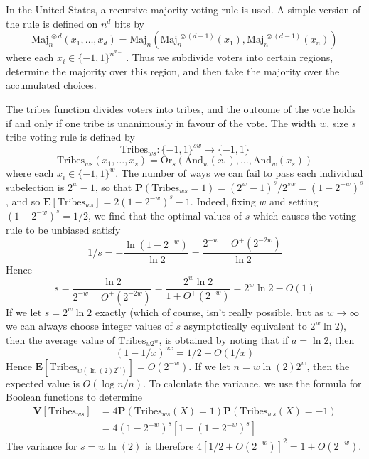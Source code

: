 \begin{example}
    In the United States, a recursive majority voting rule is used. A simple version of the rule is defined on $n^d$ bits by
    \[ \text{Maj}_n^{\ \otimes d}(x_1, \dots, x_d) = \text{Maj}_n(\text{Maj}^{\ \otimes (d-1)}_n(x_1), \text{Maj}^{\ \otimes (d-1)}_n(x_n)) \]
    where each $x_i \in \{ -1, 1 \}^{n^{d-1}}$. Thus we subdivide voters into certain regions, determine the majority over this region, and then take the majority over the accumulated choices.
\end{example}

\begin{example}
    The tribes function divides voters into tribes, and the outcome of the vote holds if and only if one tribe is unanimously in favour of the vote. The width $w$, size $s$ tribe voting rule is defined by
    \[ \text{Tribes}_{ws}: \{ -1, 1 \}^{sw} \to \{ -1, 1 \} \]
    \[ \text{Tribes}_{ws}(x_1, \dots, x_s) = \text{Or}_s(\text{And}_w(x_1), \dots, \text{And}_w(x_s)) \]
    where each $x_i \in \{ -1, 1 \}^w$. The number of ways we can fail to pass each individual subelection is $2^w - 1$, so that $\mathbf{P}(\text{Tribes}_{ws} = 1) = (2^w - 1)^s/2^{sw} = (1 - 2^{-w})^s$, and so $\mathbf{E}[\text{Tribes}_{ws}] = 2(1 - 2^{-w})^s - 1$. Indeed, fixing $w$ and setting $(1 - 2^{-w})^s = 1/2$, we find that the optimal values of $s$ which causes the voting rule to be unbiased satisfy
    \[ 1/s = - \frac{\ln(1 - 2^{-w})}{\ln 2} = \frac{2^{-w} + O^+(2^{-2w})}{\ln 2} \]
    Hence
    \[ s = \frac{\ln 2}{2^{-w} + O^+(2^{-2w})} = \frac{2^w \ln 2}{1 + O^+(2^{-w})} = 2^w \ln 2 - O(1) \]
    If we let $s = 2^w \ln 2$ exactly (which of course, isn't really possible, but as $w \to \infty$ we can always choose integer values of $s$ asymptotically equivalent to $2^w \ln 2$), then the average value of $\text{Tribes}_{w2^w}$, is obtained by noting that if $a = \ln 2$, then
    \[ (1 - 1/x)^{ax} = 1/2 + O(1/x) \]
    Hence $\mathbf{E}[\text{Tribes}_{w(\ln(2) 2^w)}] = O(2^{-w})$. If we let $n = w \ln(2) 2^w$, then the expected value is $O(\log n/n)$. To calculate the variance, we use the formula for Boolean functions to determine
    \begin{align*}
        \mathbf{V}[\text{Tribes}_{ws}] &= 4\mathbf{P}(\text{Tribes}_{ws}(X) = 1) \mathbf{P}(\text{Tribes}_{ws}(X) = -1)\\
        &= 4(1 - 2^{-w})^s[1 - (1 - 2^{-w})^{s}]
    \end{align*}
    The variance for $s = w \ln(2)$ is therefore $4[1/2 + O(2^{-w})]^2 = 1 + O(2^{-w})$.
\end{example}

